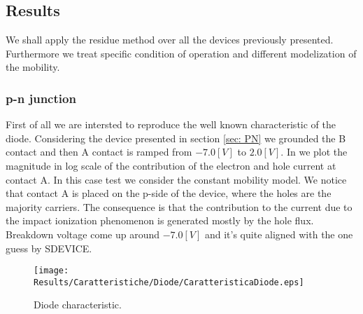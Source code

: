 %
%
%

\subsection{Results}

We shall apply the residue method over all the devices previously presented. Furthermore we treat specific condition of operation and different modelization of the mobility.

\subsubsection{p-n junction}

First of all we are intersted to reproduce the well known characteristic of the diode. Considering the device presented in section \ref{sec: PN} we grounded the B contact and then A contact is ramped from $-7.0[V]$ to $2.0[V]$. In   we plot the magnitude in log scale of the contribution of the electron and hole current at contact A. In this case test we consider the constant mobility model. 
We notice that contact A is placed on the p-side of the device, where the holes are the majority carriers. The consequence is that the contribution to the current due to the impact ionization phenomenon is generated mostly by the hole flux. 
Breakdown voltage come up around $-7.0[V]$ and it's quite aligned with the one guess by SDEVICE.

\begin{figure}[!h]
\centering
\texttt{[image: Results/Caratteristiche/Diode/CaratteristicaDiode.eps]}
\caption{Diode characteristic.}
\label{fig: caratteristica diode}
\end{figure}

